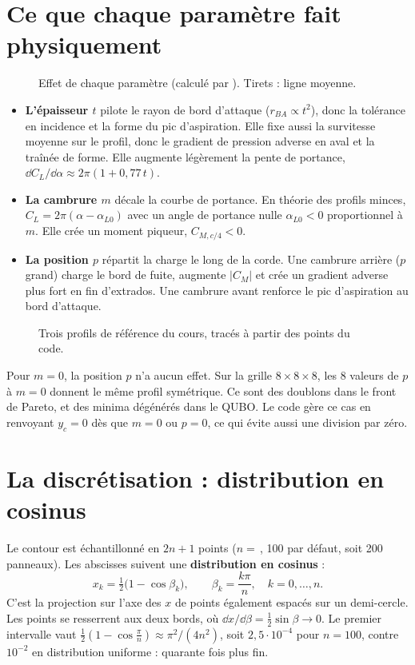 \section{Ce que chaque paramètre fait physiquement}
\begin{figure}[htbp]
\centering

\caption{Effet de chaque paramètre (calculé par ). Tirets : ligne moyenne.}\label{fig:parametres}
\end{figure}
\begin{itemize}
\item \textbf{L'épaisseur $t$} pilote le rayon de bord d'attaque ($r_{BA}\propto t^2$), donc la tolérance en incidence et la forme du pic d'aspiration. Elle fixe aussi la survitesse moyenne sur le profil, donc le gradient de pression adverse en aval et la traînée de forme. Elle augmente légèrement la pente de portance, $\dd C_L/\dd\alpha\approx2\pi(1+0{,}77\,t)$.
\item \textbf{La cambrure $m$} décale la courbe de portance. En théorie des profils minces, $C_L=2\pi(\alpha-\alpha_{L0})$ avec un angle de portance nulle $\alpha_{L0}<0$ proportionnel à $m$. Elle crée un moment piqueur, $C_{M,c/4}<0$.
\item \textbf{La position $p$} répartit la charge le long de la corde. Une cambrure arrière ($p$ grand) charge le bord de fuite, augmente $|C_{M}|$ et crée un gradient adverse plus fort en fin d'extrados. Une cambrure avant renforce le pic d'aspiration au bord d'attaque.
\end{itemize}

\begin{figure}[htbp]
\centering

\caption{Trois profils de référence du cours, tracés à partir des points du code.}\label{fig:profils}
\end{figure}

\begin{piege}
Pour $m=0$, la position $p$ n'a aucun effet. Sur la grille $8\times8\times8$, les 8 valeurs de $p$ à $m=0$ donnent le même profil symétrique. Ce sont des doublons dans le front de Pareto, et des minima dégénérés dans le QUBO. Le code gère ce cas en renvoyant $y_c=0$ dès que $m=0$ ou $p=0$, ce qui évite aussi une division par zéro.
\end{piege}

\section{La discrétisation : distribution en cosinus}
Le contour est échantillonné en $2n+1$ points ($n=$\,, 100 par défaut, soit 200 panneaux). Les abscisses suivent une \textbf{distribution en cosinus} :
\[
x_k=\tfrac12\big(1-\cos\beta_k\big),\qquad \beta_k=\frac{k\pi}{n},\quad k=0,\dots,n .
\]
C'est la projection sur l'axe des $x$ de points également espacés sur un demi-cercle. Les points se resserrent aux deux bords, où $\dd x/\dd\beta=\tfrac12\sin\beta\to0$. Le premier intervalle vaut $\tfrac12(1-\cos\tfrac\pi n)\approx\pi^2/(4n^2)$, soit $2{,}5\cdot10^{-4}$ pour $n=100$, contre $10^{-2}$ en distribution uniforme : quarante fois plus fin.

